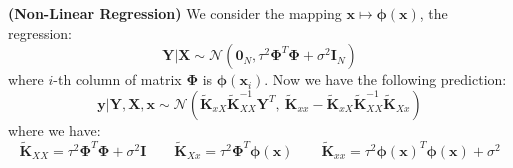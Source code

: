 \begin{remark}{\textbf{(Non-Linear Regression)}}
    We consider the mapping $\boldsymbol x\mapsto \boldsymbol \phi(\boldsymbol x)$, the regression:
    \begin{equation*}
        \boldsymbol Y | \boldsymbol X \sim \mathcal{N}(\boldsymbol 0_N, \tau^2 \boldsymbol \Phi^T\boldsymbol \Phi + \sigma^2\boldsymbol I_N)
    \end{equation*}
    where $i$-th column of matrix $\boldsymbol \Phi$ is $\boldsymbol \phi(\boldsymbol x_i)$. Now we have the following prediction:
    \begin{equation*}
        \boldsymbol y | \boldsymbol Y, \boldsymbol X, \boldsymbol x \sim \mathcal{N}(\tilde{\boldsymbol K}_{xX}\tilde{\boldsymbol K}_{XX}^{-1}\boldsymbol Y^T, \ \tilde{\boldsymbol K}_{xx}-\tilde{\boldsymbol K}_{xX}\tilde{\boldsymbol K}^{-1}_{XX}\tilde{\boldsymbol K}_{Xx})
    \end{equation*}
    where we have:
    \begin{equation*}
        \tilde{\boldsymbol K}_{XX} = \tau^2\boldsymbol \Phi^T\boldsymbol \Phi + \sigma^2\boldsymbol I \qquad \tilde{\boldsymbol K}_{Xx} = \tau^2\boldsymbol \Phi^T\boldsymbol \phi(\boldsymbol x) \qquad \tilde{\boldsymbol K}_{xx} = \tau^2\boldsymbol \phi(\boldsymbol x)^T\boldsymbol \phi(\boldsymbol x) + \sigma^2
    \end{equation*}
\end{remark}


